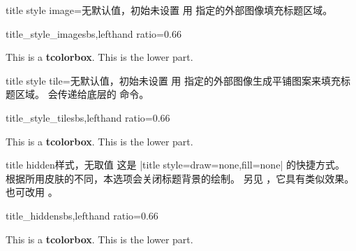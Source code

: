 \clearpage
\begin{docTcbKey}{title style image}{=}{无默认值，初始未设置}
  用  指定的外部图像填充标题区域。
\begin{exdispExample*}{title_style_image}{sbs,lefthand ratio=0.66}

\begin{tcolorbox}[enhanced,title=My title,
  title style image=blueshade.png]
This is a \textbf{tcolorbox}.
\tcblower
This is the lower part.
\end{tcolorbox}
\end{exdispExample*}
\end{docTcbKey}


\begin{docTcbKey}{title style tile}{=}{无默认值，初始未设置}
  用  指定的外部图像生成平铺图案来填充标题区域。
  会传递给底层的  命令。
\begin{exdispExample*}{title_style_tile}{sbs,lefthand ratio=0.66}

\begin{tcolorbox}[enhanced,title=My title,
  title style tile={width=1cm}{pink_marble.png}]
This is a \textbf{tcolorbox}.
\tcblower
This is the lower part.
\end{tcolorbox}
\end{exdispExample*}
\end{docTcbKey}


\begin{docTcbKey}{title hidden}{}{样式，无取值}
  这是 |title style={draw=none,fill=none}| 的快捷方式。
  根据所用皮肤的不同，本选项会关闭标题背景的绘制。
  另见 ，它具有类似效果。
  也可改用 。
\begin{exdispExample*}{title_hidden}{sbs,lefthand ratio=0.66}

\begin{tcolorbox}[title=My title,
  enhanced,title hidden]
This is a \textbf{tcolorbox}.
\tcblower
This is the lower part.
\end{tcolorbox}
\end{exdispExample*}
\end{docTcbKey}


